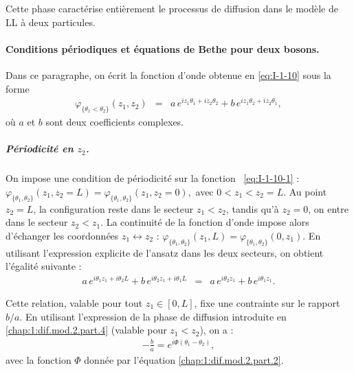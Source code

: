 Cette phase caractérise entièrement le processus de diffusion dans le modèle de \gls{LL} à deux particules.

\paragraph{Conditions périodiques et équations de Bethe pour deux bosons.}

Dans ce paragraphe, on écrit la fonction d’onde obtenue en \eqref{eq:I-1-10} sous la forme
\begin{eqnarray}\label{eq:I-1-10-1}
	\varphi_{\{\theta_1 < \theta_2\}}(z_1 , z_2) 
	&=&  a\, e^{ i z_1 \theta_1 + i z_2 \theta_2 } 
	+ b\, e^{ i z_1 \theta_2 + i z_2 \theta_1}, 
\end{eqnarray}
où $a$ et $b$ sont deux coefficients complexes.

\subparagraph{Périodicité en \( z_2 \).}  
On impose une condition de périodicité sur la fonction ~\eqref{eq:I-1-10-1} :
\(
	\varphi_{\{\theta_1,\theta_2\}}(z_1, z_2 = L) = \varphi_{\{\theta_1,\theta_2\}}(z_1, z_2 = 0),
\)
avec \( 0 < z_1 < z_2 = L \).  
Au point \( z_2 = L \), la configuration reste dans le secteur \( z_1 < z_2 \), tandis qu’à \( z_2 = 0 \), on entre dans le secteur \( z_2 < z_1 \). La continuité de la fonction d’onde impose alors d’échanger les coordonnées \( z_1 \leftrightarrow z_2 \) :
\(
	\varphi_{\{\theta_1,\theta_2\}}(z_1, L) = \varphi_{\{\theta_1,\theta_2\}}(0, z_1).
\)
En utilisant l’expression explicite de l’ansatz dans les deux secteurs, on obtient l’égalité suivante :
\begin{eqnarray}\label{eq:I-1-10-2}
	a\,e^{i\theta_1 z_1 + i\theta_2 L} + b\,e^{i\theta_2 z_1 + i\theta_1 L}
	&=& a\,e^{i\theta_2 z_1} + b\,e^{i\theta_1 z_1}.
\end{eqnarray}

Cette relation, valable pour tout \( z_1 \in [0,L] \), fixe une contrainte sur le rapport \( b/a \). En utilisant l’expression de la phase de diffusion introduite en \eqref{chap:1:dif.mod.2.part.4} (valable pour $z_1<z_2$), on a :
\begin{eqnarray}\label{eq:I-1-10-3}
	-\frac{b}{a} = e^{i\Phi(\theta_1 - \theta_2)},
\end{eqnarray}
avec la fonction $\Phi$ donnée par l'équation \eqref{chap:1:dif.mod.2.part.2}.

\medskip


